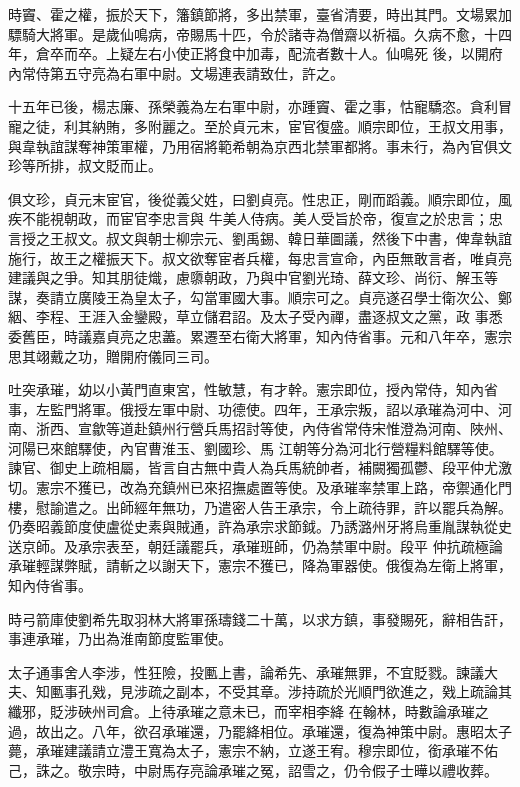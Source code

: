 \begin{pinyinscope}
 時竇、霍之權，振於天下，籓鎮節將，多出禁軍，臺省清要，時出其門。文場累加驃騎大將軍。是歲仙鳴病，帝賜馬十匹，令於諸寺為僧齋以祈福。久病不愈，十四年，倉卒而卒。上疑左右小使正將食中加毒，配流者數十人。仙鳴死
 後，以開府內常侍第五守亮為右軍中尉。文場連表請致仕，許之。



 十五年已後，楊志廉、孫榮義為左右軍中尉，亦踵竇、霍之事，怙寵驕恣。貪利冒寵之徒，利其納賄，多附麗之。至於貞元末，宦官復盛。順宗即位，王叔文用事，與韋執誼謀奪神策軍權，乃用宿將範希朝為京西北禁軍都將。事未行，為內官俱文珍等所排，叔文貶而止。



 俱文珍，貞元末宦官，後從義父姓，曰劉貞亮。性忠正，剛而蹈義。順宗即位，風疾不能視朝政，而宦官李忠言與
 牛美人侍病。美人受旨於帝，復宣之於忠言；忠言授之王叔文。叔文與朝士柳宗元、劉禹錫、韓日華圖議，然後下中書，俾韋執誼施行，故王之權振天下。叔文欲奪宦者兵權，每忠言宣命，內臣無敢言者，唯貞亮建議與之爭。知其朋徒熾，慮隳朝政，乃與中官劉光琦、薛文珍、尚衍、解玉等謀，奏請立廣陵王為皇太子，勾當軍國大事。順宗可之。貞亮遂召學士衛次公、鄭絪、李程、王涯入金鑾殿，草立儲君詔。及太子受內禪，盡逐叔文之黨，政
 事悉委舊臣，時議嘉貞亮之忠藎。累遷至右衛大將軍，知內侍省事。元和八年卒，憲宗思其翊戴之功，贈開府儀同三司。



 吐突承璀，幼以小黃門直東宮，性敏慧，有才幹。憲宗即位，授內常侍，知內省事，左監門將軍。俄授左軍中尉、功德使。四年，王承宗叛，詔以承璀為河中、河南、浙西、宣歙等道赴鎮州行營兵馬招討等使，內侍省常侍宋惟澄為河南、陜州、河陽已來館驛使，內官曹淮玉、劉國珍、馬
 江朝等分為河北行營糧料館驛等使。諫官、御史上疏相屬，皆言自古無中貴人為兵馬統帥者，補闕獨孤鬱、段平仲尤激切。憲宗不獲已，改為充鎮州已來招撫處置等使。及承璀率禁軍上路，帝禦通化門樓，慰諭遣之。出師經年無功，乃遣密人告王承宗，令上疏待罪，許以罷兵為解。仍奏昭義節度使盧從史素與賊通，許為承宗求節鉞。乃誘潞州牙將烏重胤謀執從史送京師。及承宗表至，朝廷議罷兵，承璀班師，仍為禁軍中尉。段平
 仲抗疏極論承璀輕謀弊賦，請斬之以謝天下，憲宗不獲已，降為軍器使。俄復為左衛上將軍，知內侍省事。



 時弓箭庫使劉希先取羽林大將軍孫璹錢二十萬，以求方鎮，事發賜死，辭相告訐，事連承璀，乃出為淮南節度監軍使。



 太子通事舍人李涉，性狂險，投匭上書，論希先、承璀無罪，不宜貶戮。諫議大夫、知匭事孔戣，見涉疏之副本，不受其章。涉持疏於光順門欲進之，戣上疏論其纖邪，貶涉硤州司倉。上待承璀之意未已，而宰相李絳
 在翰林，時數論承璀之過，故出之。八年，欲召承璀還，乃罷絳相位。承璀還，復為神策中尉。惠昭太子薨，承璀建議請立澧王寬為太子，憲宗不納，立遂王宥。穆宗即位，銜承璀不佑己，誅之。敬宗時，中尉馬存亮論承璀之冤，詔雪之，仍令假子士曄以禮收葬。




\end{pinyinscope}
